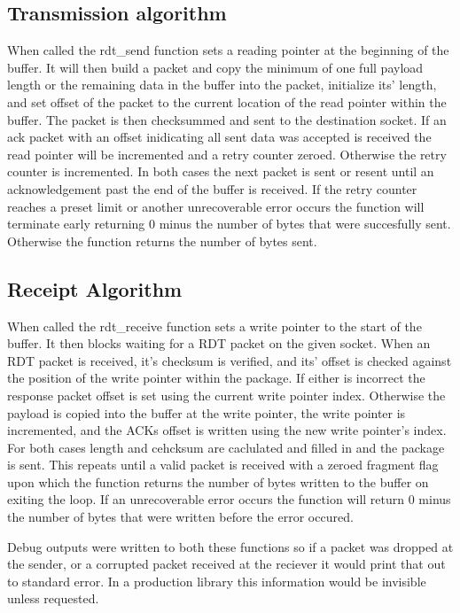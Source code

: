 \documentclass[11pt]{article}
\begin{document}
\subsection{Transmission algorithm}
When called the rdt\_send function sets a reading pointer at the beginning of the buffer.  It will then build a packet and copy the minimum of one full payload length or the remaining data in the buffer into the packet, initialize its' length, and set offset of the packet to the current location of the read pointer within the buffer.  The packet is then checksummed and sent to the destination socket.  If an ack packet with an offset inidicating all sent data was accepted is received the read pointer will be incremented and a retry counter zeroed.  Otherwise the retry counter is incremented.  In both cases the next packet is sent or resent until an acknowledgement past the end of the buffer is received.  If the retry counter reaches a preset limit or another unrecoverable error occurs the function will terminate early returning 0 minus the number of bytes that were succesfully sent.  Otherwise the function returns the number of bytes sent.
\subsection{Receipt Algorithm}
When called the rdt\_receive function sets a write pointer to the start of the buffer.  It then blocks waiting for a RDT packet on the given socket.  When an RDT packet is received, it's checksum is verified, and its' offset is checked against the position of the write pointer within the package.  If either is incorrect the response packet offset is set using the current write pointer index.  Otherwise the payload is copied into the buffer at the write pointer, the write pointer is incremented, and the ACKs offset is written using the new write pointer's index. For both cases length and cehcksum are caclulated and filled in and the package is sent.  This repeats until a valid packet is received with a zeroed fragment flag upon which the function returns the number of bytes written to the buffer on exiting the loop.  If an unrecoverable error occurs the function will return 0 minus the number of bytes that were written before the error occured.\\
\par Debug outputs were written to both these functions so if a packet was dropped at the sender, or a corrupted packet received at the reciever it would print that out to standard error.  In a production library this information would be invisible unless requested.
\end{document}
